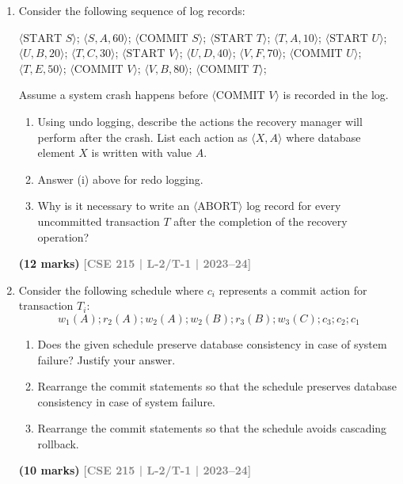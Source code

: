 \documentclass[12pt,a3paper]{article}
\newcommand{\yr}[1]{\hfill\textcolor{gray}{\small\textbf{[#1]}}}
\newcommand{\mk}[1]{\textcolor{orange!70!black}{\small\textbf{(#1 marks)}}}
\begin{document}
\begin{enumerate}
\item Consider the following sequence of log records:
\begin{center}
\small\ttfamily
$\langle\text{START } S\rangle$; $\langle S, A, 60\rangle$; $\langle\text{COMMIT } S\rangle$; $\langle\text{START } T\rangle$; $\langle T, A, 10\rangle$; $\langle\text{START } U\rangle$; $\langle U, B, 20\rangle$; $\langle T, C, 30\rangle$; $\langle\text{START } V\rangle$; $\langle U, D, 40\rangle$; $\langle V, F, 70\rangle$; $\langle\text{COMMIT } U\rangle$; $\langle T, E, 50\rangle$; $\langle\text{COMMIT } V\rangle$; $\langle V, B, 80\rangle$; $\langle\text{COMMIT } T\rangle$;
\end{center}
Assume a system crash happens before $\langle\text{COMMIT } V\rangle$ is recorded in the log.
\begin{enumerate}
  \item Using undo logging, describe the actions the recovery manager will perform after the crash. List each action as $\langle X, A\rangle$ where database element $X$ is written with value $A$.
  \item Answer (i) above for redo logging.
  \item Why is it necessary to write an $\langle\text{ABORT}\rangle$ log record for every uncommitted transaction $T$ after the completion of the recovery operation?
\end{enumerate}
\mk{12} \yr{CSE 215 | L-2/T-1 | 2023--24}

\item Consider the following schedule where $c_i$ represents a commit action for transaction $T_i$:
\[w_1(A); r_2(A); w_2(A); w_2(B); r_3(B); w_3(C); c_3; c_2; c_1\]
\begin{enumerate}
  \item Does the given schedule preserve database consistency in case of system failure? Justify your answer.
  \item Rearrange the commit statements so that the schedule preserves database consistency in case of system failure.
  \item Rearrange the commit statements so that the schedule avoids cascading rollback.
\end{enumerate}
\mk{10} \yr{CSE 215 | L-2/T-1 | 2023--24}


\end{enumerate}
\end{document}
